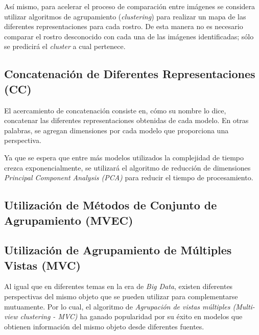 \documentclass[a4paper, 10pt, conference]{ieeeconf}      %
\begin{document}
    Así mismo, para acelerar el proceso de comparación entre imágenes se considera utilizar
    algoritmos de agrupamiento (\textit{clustering}) para realizar un mapa de las diferentes
    representaciones para cada rostro. De esta manera no es necesario comparar el rostro
    desconocido con cada una de las imágenes identificadas; sólo se predicirá el \textit{cluster} a
    cual pertenece.

    \subsection{Concatenación de Diferentes Representaciones (CC)}
    El acercamiento de concatenación consiste en, cómo su nombre lo dice, concatenar las
    diferentes representaciones obtenidas de cada modelo. En otras palabras, se agregan dimensiones
    por cada modelo que proporciona una perspectiva.
    
    Ya que se espera que entre más modelos utilizados la complejidad de tiempo crezca
    exponencialmente, se utilizará el algoritmo de reducción de dimensiones
    \textit{Principal Component Analysis (PCA)} para reducir el tiempo de procesamiento.
    \subsection{Utilización de Métodos de Conjunto de Agrupamiento (MVEC)}

    \subsection{Utilización de Agrupamiento de Múltiples Vistas (MVC)}
    Al igual que en diferentes temas en la era de \textit{Big Data}, existen
    diferentes perspectivas del mismo objeto que se pueden utilizar para complementarse
    mutuamente. Por lo cual, el algoritmo de
    \textit{Agrupación de vistas múltiples (Multi-view clustering - MVC)} ha ganado
    popularidad por su éxito en modelos que obtienen información del mismo objeto
    desde diferentes fuentes.
\end{document}

